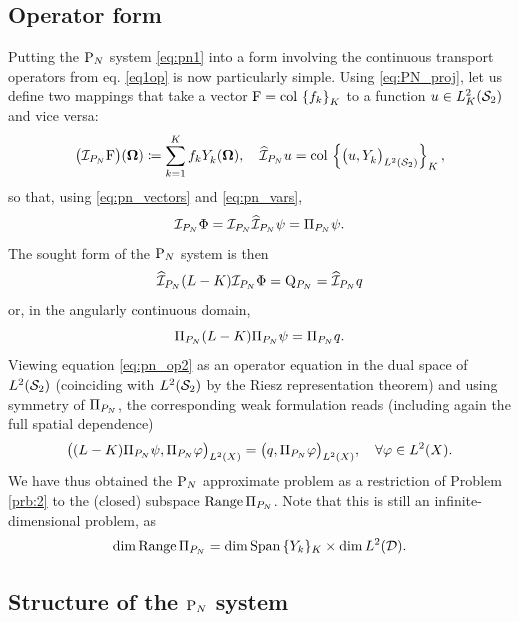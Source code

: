 \subsection{Operator form} \label{sec:pn_op}
Putting the $\PN$ system \eqref{eq:pn1} into a form involving the continuous transport operators
from eq. \eqref{eq1op}
is now particularly simple.
Using \eqref{eq:PN_proj}, let us define two mappings that take a vector $\mathrm{F} = \colset{f_k}{K}$ to a
function \mbox{$u\in\Lp[2]_K(\Sphere)$} and vice versa:%
\begin{equation}\label{eq:pn_op_def}
\bigl(\PiPN\mathrm{F}\bigr)(\bomega) \coloneqq \sum_{k=1}^{ K} f_k\Y{k}{}(\bomega), \quad
\PihPN u = \col \left\{\bigl(u, \Y{k}{}\bigr)_{\Lp[2](\Sphere)}\right\}_{\idxset{K}},
\end{equation} 
so that, using \eqref{eq:pn_vectors} and \eqref{eq:pn_vars},
$$
\PiPN\Phi = \PiPN\PihPN \psi = \Projop\psi.
$$ 
% 
The sought form of the $\PN$ system is then
\begin{equation}\label{eq:pn_op}
	\PihPN (L-K) \PiPN\Phi = \mathrm{Q}_{P_N} = \PihPN q
\end{equation}
or, in the angularly continuous domain,
\begin{equation}\label{eq:pn_op2}
	\Projop (L-K) \Projop\psi = \Projop q.
\end{equation}
Viewing equation \eqref{eq:pn_op2} as an operator equation in the dual space of $\Lp[2](\Sphere)$ (coinciding
with $\Lp[2](\Sphere)$ by the Riesz representation theorem) and using symmetry of $\Projop$, the corresponding weak
formulation reads (including again the full spatial dependence)
\begin{equation}\label{eq:pn_weak}
	\bigl( (L-K)\Projop\psi, \Projop\varphi\bigr)_{\Lp[2](X)} = \bigl( q, \Projop\varphi\bigr)_{\Lp[2](X)},\quad
	\forall\varphi\in\Lp[2](X).
\end{equation}
We have thus obtained the $\PN$ approximate problem as a restriction of Problem \ref{prb:2} to the (closed) subspace
$\Rng\Projop$. Note that this is still an infinite-dimensional problem, as 
$$
	\dim \Rng\Projop = \dim \text{Span}\,\{Y_k\}_K \times \dim \Lp[2](\VV).
$$
\subsection{Structure of the $\PN$ system}\label{sec:PN_struct}
